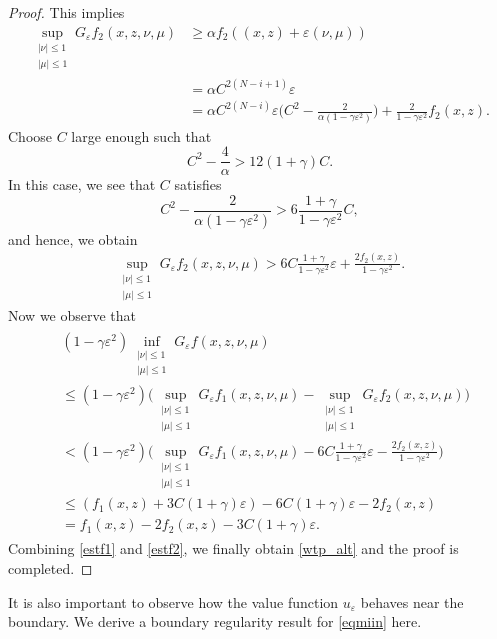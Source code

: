 \documentclass[english]{amsart}
\newcommand{\eps}{\varepsilon}
\theoremstyle{plain}
\theoremstyle{definition}
\theoremstyle{remark}
\numberwithin{equation}{section}
\begin{document}
\begin{proof}
This implies 
\begin{align*}
 \sup_{\substack{|\nu|\le1\\|\mu|\le1}}G_{\eps}f_2 (x,z,\nu,\mu)& \ge \alpha f_{2}((x,z)+\eps(\nu, \mu))
\\ & = \alpha C^{2(N-i+1)}\eps 
\\ & = \alpha C^{2(N-i)}\eps \bigg(C^{2}-\frac{2}{\alpha( 1-\gamma\eps^2)}\bigg) + \frac{2}{1-\gamma\eps^2}f_{2}(x,z).
\end{align*}
Choose $C$ large enough such that
$$ C^{2}-\frac{4}{\alpha }>12(1+\gamma)C.$$
In this case, we see that $C$ satisfies
$$ C^{2}-\frac{2}{\alpha (1-\gamma\eps^2)}>6\frac{1+\gamma}{1-\gamma\eps^2}C,$$
and hence, we obtain 
\begin{align} \label{supf2} \sup_{\substack{|\nu|\le1\\|\mu|\le1}}G_{\eps}f_2 (x,z,\nu,\mu)>  6C\frac{1+\gamma}{1-\gamma\eps^2}\eps  +\frac{2 f_{2}(x,z)}{1-\gamma\eps^2}.
\end{align}
Now we observe that 
\begin{align}\label{estf2}\begin{split}  & (1-\gamma\eps^2)\inf_{\substack{|\nu|\le1\\|\mu|\le1}}G_{\eps}f(x,z,\nu,\mu)\\ &
\le  (1-\gamma\eps^2)\bigg(\sup_{\substack{|\nu|\le1\\|\mu|\le1}}G_{\eps}f_1 (x,z,\nu,\mu)- \sup_{\substack{|\nu|\le1\\|\mu|\le1}}G_{\eps}f_2 (x,z,\nu,\mu) \bigg)
\\ &  < (1-\gamma\eps^2)\bigg(  \sup_{\substack{|\nu|\le1\\|\mu|\le1}}G_{\eps}f_1(x,z,\nu,\mu) -
6C\frac{1+\gamma}{1-\gamma\eps^2}\eps  -\frac{2 f_{2}(x,z)}{1-\gamma\eps^2} \bigg)
\\ & \le (f_{1}(x,z)+3C(1+\gamma)\eps )  -
6C(1+\gamma)\eps  -  2f_{2}(x,z)
\\ & =f_1(x,z)-2f_2(x,z)-3C(1+\gamma)\eps  .\end{split}
\end{align}
Combining \eqref{estf1} and \eqref{estf2}, we finally obtain \eqref{wtp_alt}
and the proof is completed.
\end{proof}

It is also important to observe how the value function $u_{\eps}$ behaves near the boundary. 
We derive a boundary regularity result for \eqref{eqmiin} here.
\end{document}
